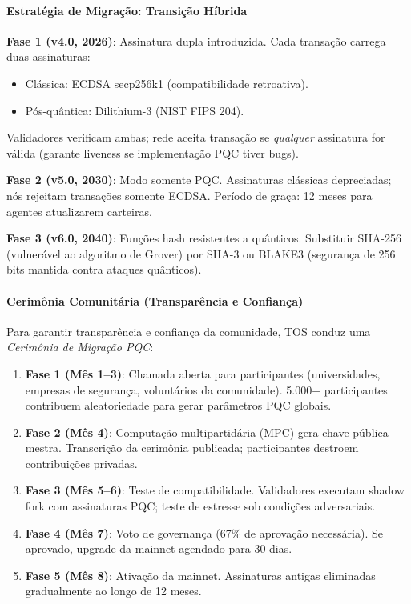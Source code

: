 \documentclass[11pt]{article}
\begin{document}
\paragraph{Estratégia de Migração: Transição Híbrida}
\textbf{Fase 1 (v4.0, 2026)}: Assinatura dupla introduzida. Cada transação carrega duas assinaturas:
\begin{itemize}[noitemsep]
  \item Clássica: ECDSA secp256k1 (compatibilidade retroativa).
  \item Pós-quântica: Dilithium-3 (NIST FIPS 204).
\end{itemize}
Validadores verificam ambas; rede aceita transação se \emph{qualquer} assinatura for válida (garante liveness se implementação PQC tiver bugs).

\textbf{Fase 2 (v5.0, 2030)}: Modo somente PQC. Assinaturas clássicas depreciadas; nós rejeitam transações somente ECDSA. Período de graça: 12 meses para agentes atualizarem carteiras.

\textbf{Fase 3 (v6.0, 2040)}: Funções hash resistentes a quânticos. Substituir SHA-256 (vulnerável ao algoritmo de Grover) por SHA-3 ou BLAKE3 (segurança de 256 bits mantida contra ataques quânticos).

\paragraph{Cerimônia Comunitária (Transparência e Confiança)}
Para garantir transparência e confiança da comunidade, TOS conduz uma \emph{Cerimônia de Migração PQC}:
\begin{enumerate}[noitemsep]
  \item \textbf{Fase 1 (Mês 1--3)}: Chamada aberta para participantes (universidades, empresas de segurança, voluntários da comunidade). 5.000+ participantes contribuem aleatoriedade para gerar parâmetros PQC globais.
  \item \textbf{Fase 2 (Mês 4)}: Computação multipartidária (MPC) gera chave pública mestra. Transcrição da cerimônia publicada; participantes destroem contribuições privadas.
  \item \textbf{Fase 3 (Mês 5--6)}: Teste de compatibilidade. Validadores executam shadow fork com assinaturas PQC; teste de estresse sob condições adversariais.
  \item \textbf{Fase 4 (Mês 7)}: Voto de governança (67\% de aprovação necessária). Se aprovado, upgrade da mainnet agendado para 30 dias.
  \item \textbf{Fase 5 (Mês 8)}: Ativação da mainnet. Assinaturas antigas eliminadas gradualmente ao longo de 12 meses.
\end{enumerate}
\end{document}
